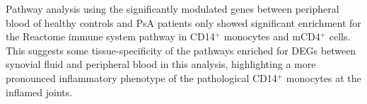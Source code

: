 Pathway analysis using the significantly modulated genes between peripheral blood of healthy controls and PsA patients only showed significant enrichment for the Reactome immune system pathway in CD14$^+$ monocytes and mCD4$^+$ cells. This suggests some tissue-specificity of the pathways enriched for DEGs between synovial fluid and peripheral blood in this analysis, highlighting a more pronounced inflammatory phenotype of the pathological CD14$^+$ monocytes at the inflamed joints.






